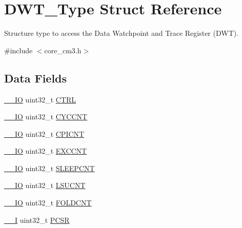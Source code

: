 \hypertarget{structDWT__Type}{\section{D\-W\-T\-\_\-\-Type Struct Reference}
\label{structDWT__Type}
}


Structure type to access the Data Watchpoint and Trace Register (D\-W\-T).  




{\ttfamily \#include $<$core\-\_\-cm3.\-h$>$}

\subsection*{Data Fields}
\begin{DoxyCompactItemize}
\item 
\hyperlink{core__cm3_8h_aec43007d9998a0a0e01faede4133d6be}{\-\_\-\-\_\-\-I\-O} uint32\-\_\-t \hyperlink{structDWT__Type_a37964d64a58551b69ce4c8097210d37d}{C\-T\-R\-L}
\item 
\hyperlink{core__cm3_8h_aec43007d9998a0a0e01faede4133d6be}{\-\_\-\-\_\-\-I\-O} uint32\-\_\-t \hyperlink{structDWT__Type_a71680298e85e96e57002f87e7ab78fd4}{C\-Y\-C\-C\-N\-T}
\item 
\hyperlink{core__cm3_8h_aec43007d9998a0a0e01faede4133d6be}{\-\_\-\-\_\-\-I\-O} uint32\-\_\-t \hyperlink{structDWT__Type_a88cca2ab8eb1b5b507817656ceed89fc}{C\-P\-I\-C\-N\-T}
\item 
\hyperlink{core__cm3_8h_aec43007d9998a0a0e01faede4133d6be}{\-\_\-\-\_\-\-I\-O} uint32\-\_\-t \hyperlink{structDWT__Type_ac0801a2328f3431e4706fed91c828f82}{E\-X\-C\-C\-N\-T}
\item 
\hyperlink{core__cm3_8h_aec43007d9998a0a0e01faede4133d6be}{\-\_\-\-\_\-\-I\-O} uint32\-\_\-t \hyperlink{structDWT__Type_a8afd5a4bf994011748bc012fa442c74d}{S\-L\-E\-E\-P\-C\-N\-T}
\item 
\hyperlink{core__cm3_8h_aec43007d9998a0a0e01faede4133d6be}{\-\_\-\-\_\-\-I\-O} uint32\-\_\-t \hyperlink{structDWT__Type_aeba92e6c7fd3de4ba06bfd94f47f5b35}{L\-S\-U\-C\-N\-T}
\item 
\hyperlink{core__cm3_8h_aec43007d9998a0a0e01faede4133d6be}{\-\_\-\-\_\-\-I\-O} uint32\-\_\-t \hyperlink{structDWT__Type_a35f2315f870a574e3e6958face6584ab}{F\-O\-L\-D\-C\-N\-T}
\item 
\hyperlink{core__cm3_8h_af63697ed9952cc71e1225efe205f6cd3}{\-\_\-\-\_\-\-I} uint32\-\_\-t \hyperlink{structDWT__Type_abc5ae11d98da0ad5531a5e979a3c2ab5}{P\-C\-S\-R}

\end{DoxyCompactItemize}
